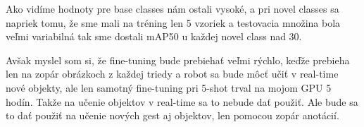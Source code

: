 Ako vidíme hodnoty pre base classes nám ostali vysoké, a pri novel classes sa napriek tomu, že sme mali na tréning len 5 vzoriek a testovacia množina bola veľmi variabilná tak sme dostali mAP50 u každej novel class nad 30. 

Avšak myslel som si, že fine-tuning bude prebiehať veľmi rýchlo, keďže prebieha len na zopár obrázkoch z každej triedy a robot sa bude môcť učiť v real-time nové objekty, ale len samotný fine-tuning pri 5-shot trval na mojom GPU 5 hodín. Takže na učenie objektov v real-time sa to nebude dať použiť. Ale bude sa to dať použiť na učenie nových gest aj objektov, len pomocou zopár anotácií. 